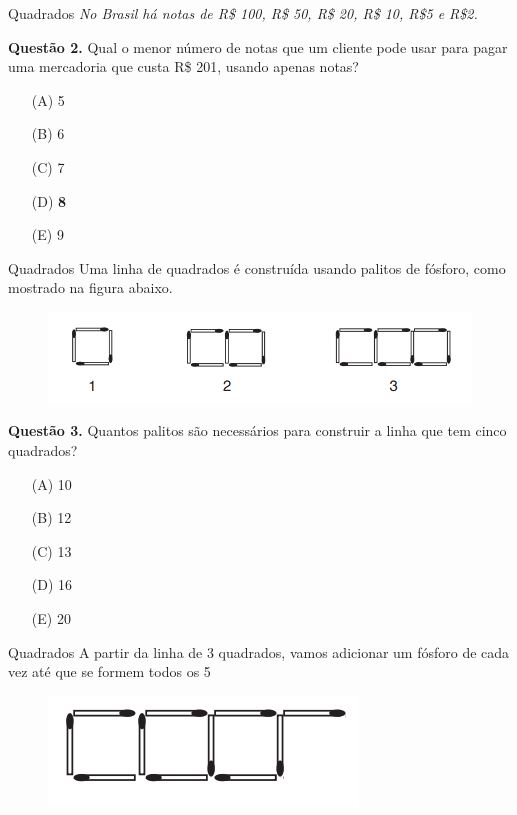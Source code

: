\documentclass{beamer}
\begin{document}
\begin{frame}{Quadrados}
\textit{No Brasil há notas de R\$ 100, R\$ 50, R\$ 20, R\$ 10, R\$5 e R\$2.}



\textbf{Questão 2.} Qual o menor número de notas que um cliente pode usar para pagar uma mercadoria que custa R\$ 201, usando apenas notas?
\begin{enumerate}
 \item[(A)] 5
 \item[(B)] 6
 \item[(C)] 7
 \item[(D)] \textbf{8}
 \item[(E)] 9
\end{enumerate}

\end{frame}


\begin{frame}{Quadrados}
Uma linha de quadrados é construída usando palitos de fósforo, como mostrado na figura abaixo.


\begin{figure}[ht]
\centering
\includegraphics[width=.9\textwidth]{fosforos.png}
\label{fig:exampleFig2}
\end{figure}

\textbf{Questão 3.} Quantos palitos são necessários para construir a linha que tem cinco quadrados?

\begin{enumerate}
 \item[(A)] 10
 \item[(B)] 12
 \item[(C)] 13
 \item[(D)] 16
 \item[(E)] 20
\end{enumerate}
\end{frame}



\begin{frame}{Quadrados}
A partir da linha de 3 quadrados, vamos adicionar um fósforo de cada vez até que se formem todos os 5
\begin{figure}[ht]
\centering
\includegraphics[width=.6\textwidth]{f1.png}
\label{fig:exampleFig2}
\end{figure}
\end{frame}
\end{document}
